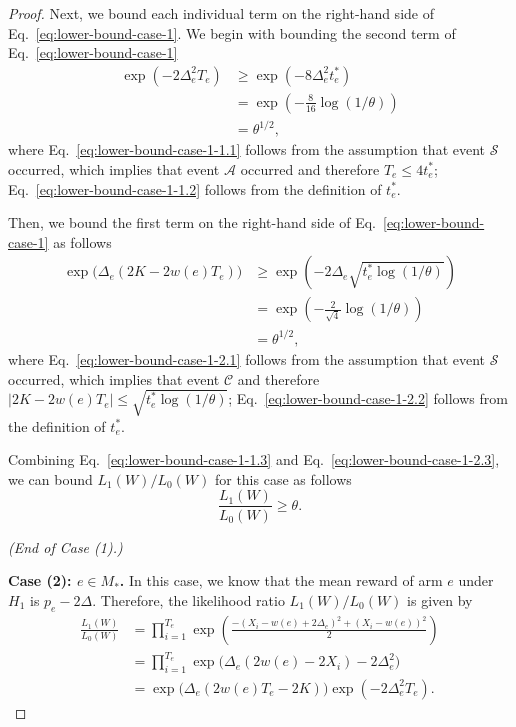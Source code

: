 \documentclass{article}
\begin{document}
\begin{spacing}{1.1}
\begin{proof}
Next, we bound each individual term on the right-hand side of Eq.~\eqref{eq:lower-bound-case-1}.
We begin with bounding the second term of Eq.~\eqref{eq:lower-bound-case-1}
\begin{align}
	\exp(-2\Delta_e^2T_e) &\ge \exp(-8\Delta_e^2t_e^*) \label{eq:lower-bound-case-1-1.1} \\
						  &=\exp\left(-\frac{8}{16}\log(1/\theta)\right) \label{eq:lower-bound-case-1-1.2}\\
						  &= \theta^{1/2}\label{eq:lower-bound-case-1-1.3},
\end{align}
where Eq.~\eqref{eq:lower-bound-case-1-1.1} follows from the assumption that event $\mathcal S$ occurred, which implies that event $\mathcal A$ occurred and therefore $T_e \le 4t_e^*$; Eq.~\eqref{eq:lower-bound-case-1-1.2} follows from the definition of $t_e^*$.

Then, we bound the first term on the right-hand side of Eq.~\eqref{eq:lower-bound-case-1} as follows
\begin{align}
	\exp\big(\Delta_e(2K-2w(e)T_e)\big) & \ge \exp\left(-2\Delta_e\sqrt{t_e^*\log(1/\theta)}\right) \label{eq:lower-bound-case-1-2.1}\\
								       & = \exp\left(-\frac{2}{\sqrt{4}}\log(1/\theta)\right) \label{eq:lower-bound-case-1-2.2}\\
								       &=\theta^{1/2},  \label{eq:lower-bound-case-1-2.3}
\end{align}
where Eq.~\eqref{eq:lower-bound-case-1-2.1} follows from the assumption that event $\mathcal S$ occurred, which implies that event $\mathcal C$ and therefore $|2K-2w(e)T_e| \le \sqrt{t_e^*\log(1/\theta)}$; 
Eq.~\eqref{eq:lower-bound-case-1-2.2} follows from the definition of $t_e^*$.

Combining Eq.~\eqref{eq:lower-bound-case-1-1.3} and Eq.~\eqref{eq:lower-bound-case-1-2.3}, we can bound $L_1(W)/L_0(W)$ for this case as follows
\begin{equation}
\label{eq:ll-case1-final} 
\frac{L_1(W)}{L_0(W)} \ge \theta. 
\end{equation}


\emph{(End of Case (1).)}

\textbf{Case (2): $e\in M_*$.}
In this case, we know that the mean reward of arm $e$ under $H_1$ is $p_e-2\Delta$.
Therefore, the likelihood ratio $L_1(W)/L_0(W)$ is given by
\begin{align}
  \frac{L_1(W)}{L_0(W)} &= \prod_{i=1}^{T_e} \exp\left(\frac{-(X_i-w(e)+2\Delta_e)^2+(X_i-w(e))^2}{2}\right) \nonumber \\
  						&= \prod_{i=1}^{T_e} \exp\big(\Delta_e(2w(e)-2X_i)-2\Delta_e^2\big) \nonumber \\
  						&= \exp\big(\Delta_e(2w(e)T_e-2K)\big)\exp(-2\Delta_e^2T_e) \label{eq:lower-bound-case-2}.
\end{align}


\end{proof}
\end{spacing}
\end{document}
